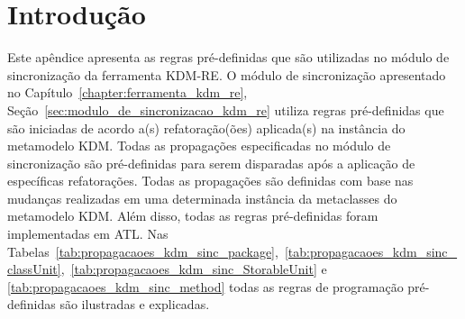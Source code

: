 \section{Introdução}

Este apêndice apresenta as regras pré-definidas que são utilizadas no módulo de sincronização da ferramenta KDM-RE. O módulo de sincronização apresentado no Capítulo~\ref{chapter:ferramenta_kdm_re}, Seção~\ref{sec:modulo_de_sincronizacao_kdm_re} utiliza regras pré-definidas que são iniciadas de acordo a(s) refatoração(ões) aplicada(s) na instância do metamodelo KDM. Todas as propagações especificadas no módulo de sincronização são pré-definidas para serem disparadas após a aplicação de específicas refatorações. Todas as propagações são definidas com base nas mudanças realizadas em uma determinada instância da metaclasses do metamodelo KDM. Além disso, todas as regras pré-definidas foram implementadas em ATL. Nas Tabelas~\ref{tab:propagacaoes_kdm_sinc_package},~\ref{tab:propagacaoes_kdm_sinc_classUnit},~\ref{tab:propagacaoes_kdm_sinc_StorableUnit} e \ref{tab:propagacaoes_kdm_sinc_method} todas as regras de programação pré-definidas são ilustradas e explicadas.  

